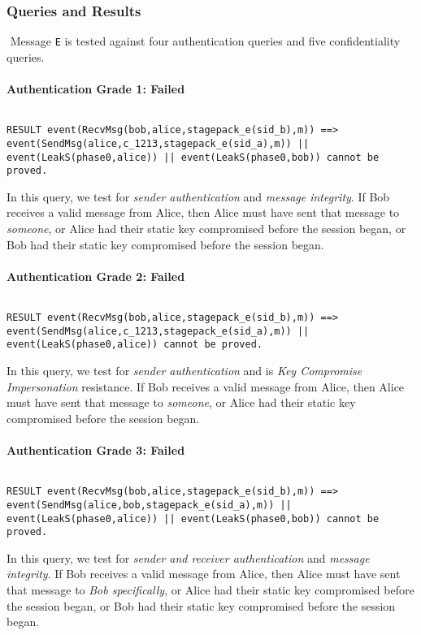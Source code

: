 \subsubsection{Queries and Results}$ $
Message \texttt{E} is tested against four authentication queries and five confidentiality queries.
\paragraph{Authentication Grade 1: Failed}$ $
\begin{lstlisting}
RESULT event(RecvMsg(bob,alice,stagepack_e(sid_b),m)) ==> event(SendMsg(alice,c_1213,stagepack_e(sid_a),m)) || event(LeakS(phase0,alice)) || event(LeakS(phase0,bob)) cannot be proved.
\end{lstlisting}

In this query, we test for \emph{sender authentication} and \emph{message integrity}. If Bob receives a valid message from Alice, then Alice must have sent that message to \emph{someone}, or Alice had their static key compromised before the session began, or Bob had their static key compromised before the session began.


\paragraph{Authentication Grade 2: Failed}$ $
\begin{lstlisting}
RESULT event(RecvMsg(bob,alice,stagepack_e(sid_b),m)) ==> event(SendMsg(alice,c_1213,stagepack_e(sid_a),m)) || event(LeakS(phase0,alice)) cannot be proved.
\end{lstlisting}

In this query, we test for \emph{sender authentication} and is \emph{Key Compromise Impersonation} resistance. If Bob receives a valid message from Alice, then Alice must have sent that message to \emph{someone}, or Alice had their static key compromised before the session began.


\paragraph{Authentication Grade 3: Failed}$ $
\begin{lstlisting}
RESULT event(RecvMsg(bob,alice,stagepack_e(sid_b),m)) ==> event(SendMsg(alice,bob,stagepack_e(sid_a),m)) || event(LeakS(phase0,alice)) || event(LeakS(phase0,bob)) cannot be proved.
\end{lstlisting}

In this query, we test for \emph{sender and receiver authentication} and \emph{message integrity}. If Bob receives a valid message from Alice, then Alice must have sent that message to \emph{Bob specifically}, or Alice had their static key compromised before the session began, or Bob had their static key compromised before the session began.


